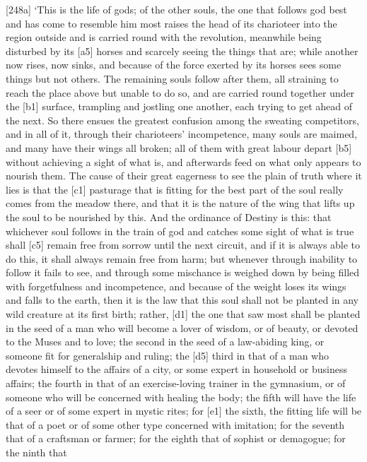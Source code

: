 {[}248a{]} ‘This is the life of gods; of the other souls, the one that
follows god best and has come to resemble him most raises the head of
its charioteer into the region outside and is carried round with the
revolution, meanwhile being disturbed by its {[}a5{]} horses and
scarcely seeing the things that are; while another now rises, now sinks,
and because of the force exerted by its horses sees some things but not
others. The remaining souls follow after them, all straining to reach
the place above but unable to do so, and are carried round together
under the {[}b1{]} surface, trampling and jostling one another, each
trying to get ahead of the next. So there ensues the greatest confusion
among the sweating competitors, and in all of it, through their
charioteers' incompetence, many souls are maimed, and many have their
wings all broken; all of them with great labour depart {[}b5{]} without
achieving a sight of what is, and afterwards feed on what only appears
to nourish them. The
cause of their great eagerness to see the plain of truth where it lies
is that the {[}c1{]} pasturage that is fitting for the best part of the
soul really comes from
the meadow there, and that it is the nature of the wing that lifts up
the soul to be nourished by this. And the ordinance of
Destiny is this: that
whichever soul follows in the train of god and catches some sight of
what is true shall {[}c5{]} remain free from sorrow until the next
circuit, and if it is always able to do this, it shall always remain
free from harm; but whenever through inability to follow it fails to
see, and through some mischance is weighed down by being filled with
forgetfulness and incompetence, and because of the weight loses its
wings and falls to the earth, then it is the law that this soul shall
not be planted in any wild creature at its first
birth; rather, {[}d1{]}
the one that saw most shall be planted in the seed of a man who will
become a lover of wisdom, or of beauty, or devoted to the Muses and to
love; the second in the
seed of a law-abiding king, or someone fit for generalship and ruling;
the {[}d5{]} third in that of a man who devotes himself to the affairs
of a city, or some expert in household or business affairs; the fourth
in that of an exercise-loving trainer in the gymnasium, or of someone
who will be concerned with healing the body; the fifth will have the
life of a seer or of some expert in mystic rites; for {[}e1{]} the
sixth, the fitting life will be that of a
poet or of some other
type concerned with imitation; for the seventh that of a craftsman or
farmer; for the eighth that of sophist or demagogue; for the ninth that
